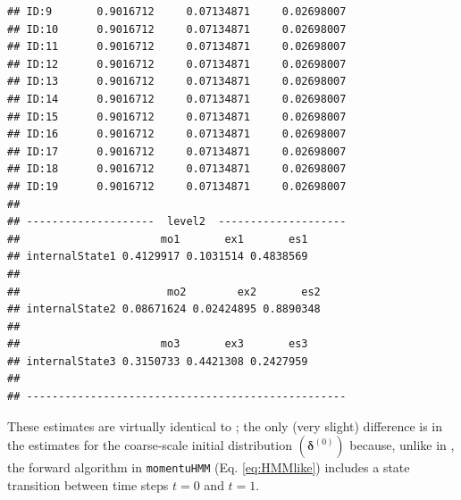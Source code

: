 \documentclass[12pt]{article}\usepackage[]{graphicx}\usepackage[]{color}
\makeatletter
\newenvironment{kframe}{%
 \def\at@end@of@kframe{}%
 \ifinner\ifhmode%
  \def\at@end@of@kframe{\end{minipage}}%
  \begin{minipage}{\columnwidth}%
 \fi\fi%
 \def\FrameCommand##1{\hskip\@totalleftmargin \hskip-\fboxsep
 \colorbox{shadecolor}{##1}\hskip-\fboxsep
     \hskip-\linewidth \hskip-\@totalleftmargin \hskip\columnwidth}%
 \MakeFramed {\advance\hsize-\width
   \@totalleftmargin\z@ \linewidth\hsize
   \@setminipage}}%
 {\par\unskip\endMakeFramed%
 \at@end@of@kframe}
\newenvironment{knitrout}{}{} %
\makeatother
\begin{document}
\begin{knitrout}
\begin{kframe}
\begin{verbatim}
## ID:9       0.9016712     0.07134871     0.02698007
## ID:10      0.9016712     0.07134871     0.02698007
## ID:11      0.9016712     0.07134871     0.02698007
## ID:12      0.9016712     0.07134871     0.02698007
## ID:13      0.9016712     0.07134871     0.02698007
## ID:14      0.9016712     0.07134871     0.02698007
## ID:15      0.9016712     0.07134871     0.02698007
## ID:16      0.9016712     0.07134871     0.02698007
## ID:17      0.9016712     0.07134871     0.02698007
## ID:18      0.9016712     0.07134871     0.02698007
## ID:19      0.9016712     0.07134871     0.02698007
## 
## --------------------  level2  --------------------
##                      mo1       ex1       es1
## internalState1 0.4129917 0.1031514 0.4838569
## 
##                       mo2        ex2       es2
## internalState2 0.08671624 0.02424895 0.8890348
## 
##                      mo3       ex3       es3
## internalState3 0.3150733 0.4421308 0.2427959
## 
## --------------------------------------------------
\end{verbatim}
\end{kframe}
\end{knitrout}
\noindent These estimates are virtually identical to \cite{Leos-BarajasEtAl2017}; the only (very slight) difference is in the estimates for the coarse-scale initial distribution $({\boldsymbol \delta}^{(0)})$ because, unlike in \cite{Leos-BarajasEtAl2017}, the forward algorithm in \verb|momentuHMM| (Eq. \ref{eq:HMMlike}) includes a state transition between time steps $t=0$ and $t=1$.
\end{document}
